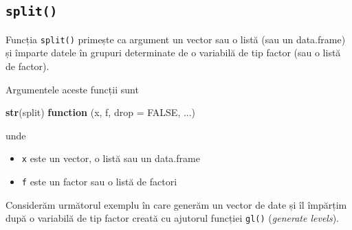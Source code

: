 \documentclass[]{article}
\newenvironment{Shaded}{\begin{snugshade}}{\end{snugshade}}
\newcommand{\ControlFlowTok}[1]{\textcolor[rgb]{0.13,0.29,0.53}{\textbf{#1}}}
\newcommand{\DataTypeTok}[1]{\textcolor[rgb]{0.13,0.29,0.53}{#1}}
\newcommand{\KeywordTok}[1]{\textcolor[rgb]{0.13,0.29,0.53}{\textbf{#1}}}
\newcommand{\NormalTok}[1]{#1}
\newcommand{\OtherTok}[1]{\textcolor[rgb]{0.56,0.35,0.01}{#1}}
\providecommand{\tightlist}{%
  \setlength{\itemsep}{0pt}\setlength{\parskip}{0pt}}
\newcounter{exo}[section]
\begin{document}
\hypertarget{split}{%
\subsection{\texorpdfstring{\texttt{split()}}{split()}}\label{split}}

Funcția \texttt{split()} primește ca argument un vector sau o listă (sau
un data.frame) și împarte datele în grupuri determinate de o variabilă
de tip factor (sau o listă de factor).

Argumentele aceste funcții sunt

\begin{Shaded}
\begin{Highlighting}[]
\KeywordTok{str}\NormalTok{(split)}
\ControlFlowTok{function}\NormalTok{ (x, f, }\DataTypeTok{drop =} \OtherTok{FALSE}\NormalTok{, ...)  }
\end{Highlighting}
\end{Shaded}

unde

\begin{itemize}
\tightlist
\item
  \texttt{x} este un vector, o listă sau un data.frame
\item
  \texttt{f} este un factor sau o listă de factori
\end{itemize}

Considerăm următorul exemplu în care generăm un vector de date și îl
împărțim după o variabilă de tip factor creată cu ajutorul funcției
\texttt{gl()} (\emph{generate levels}).
\end{document}
